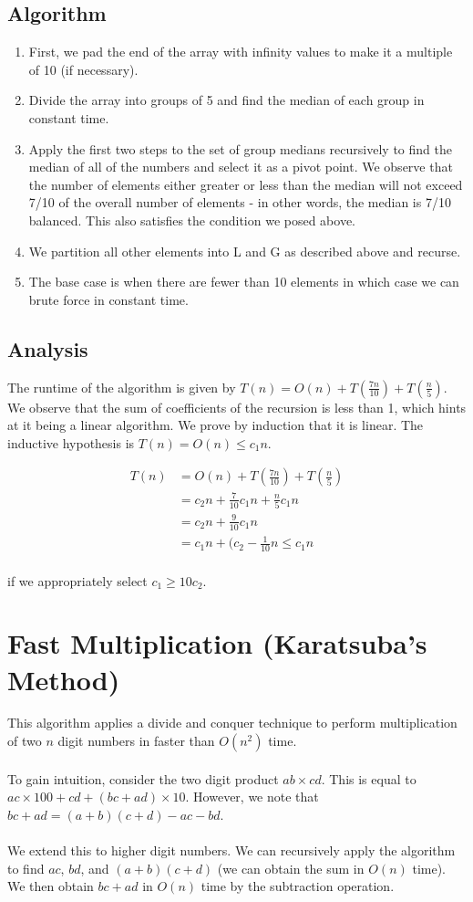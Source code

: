 \documentclass{article}
\begin{document}
\subsection*{Algorithm}
\begin{enumerate}
    \item First, we pad the end of the array with infinity values to make it a multiple of 10 (if necessary).
    \item Divide the array into groups of 5 and find the median of each group in constant time.
    \item Apply the first two steps to the set of group medians recursively to find the median of all of the numbers and select it as a pivot point. We observe that the number of elements either greater or less than the median will not exceed 7/10 of the overall number of elements - in other words, the median is 7/10 balanced. This also satisfies the condition we posed above.
    \item We partition all other elements into L and G as described above and recurse.
    \item The base case is when there are fewer than 10 elements in which case we can brute force in constant time.
\end{enumerate}

\subsection*{Analysis}
The runtime of the algorithm is given by $T(n) = O(n) + T(\frac{7n}{10}) + T(\frac{n}{5})$. We observe that the sum of coefficients of the recursion is less than 1, which hints at it being a linear algorithm. We prove by induction that it is linear. The inductive hypothesis is $T(n) = O(n) \leq c_1 n$.

\begin{align*}
    T(n) &= O(n) + T(\frac{7n}{10}) + T(\frac{n}{5})\\
    &= c_2 n + \frac{7}{10} c_1 n + \frac{n}{5} c_1 n \\
    &= c_2 n + \frac{9}{10} c_1 n \\
    &= c_1 n + (c_2 - \frac{1}{10} n \leq c_1 n
\end{align*}
\\
if we appropriately select $c_1 \geq 10 c_2$.

\newpage
\section*{Fast Multiplication (Karatsuba's Method)}
This algorithm applies a divide and conquer technique to perform multiplication of two $n$ digit numbers in faster than $O(n^2)$ time.
\\
\\
To gain intuition, consider the two digit product $ab \times cd$. This is equal to $ac \times 100 + cd + (bc + ad) \times 10$. However, we note that $bc + ad = (a + b) (c + d) - ac - bd$.
\\
\\
We extend this to higher digit numbers. We can recursively apply the algorithm to find $ac$, $bd$, and $(a+b)(c+d)$ (we can obtain the sum in $O(n)$ time). We then obtain $bc + ad$ in $O(n)$ time by the subtraction operation.
\end{document}
